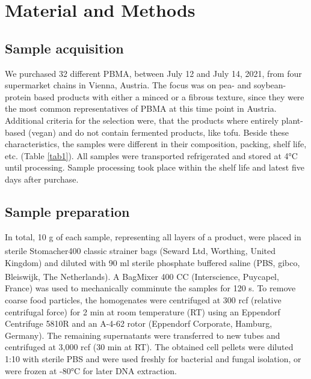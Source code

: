 \documentclass[preprint, 3p,
authoryear]{elsarticle} %
\begin{document}
\hypertarget{material-and-methods}{%
\section{Material and Methods}\label{material-and-methods}}

\hypertarget{sample-acquisition}{%
\subsection{Sample acquisition}\label{sample-acquisition}}

We purchased 32 different PBMA, between July 12 and July 14, 2021, from
four supermarket chains in Vienna, Austria. The focus was on pea- and
soybean- protein based products with either a minced or a fibrous
texture, since they were the most common representatives of PBMA at this
time point in Austria. Additional criteria for the selection were, that
the products where entirely plant-based (vegan) and do not contain
fermented products, like tofu. Beside these characteristics, the samples
were different in their composition, packing, shelf life, etc. (Table
\ref{tab1}). All samples were transported refrigerated and stored at 4°C
until processing. Sample processing took place within the shelf life and
latest five days after purchase.

\hypertarget{sample-preparation}{%
\subsection{Sample preparation}\label{sample-preparation}}

In total, 10 g of each sample, representing all layers of a product,
were placed in sterile Stomacher\textsuperscript{\textregistered}400
classic strainer bags (Seward Ltd, Worthing, United Kingdom) and diluted
with 90 ml sterile phosphate buffered saline (PBS, gibco, Bleiswijk, The
Netherlands). A BagMixer\textsuperscript{\textregistered} 400 CC
(Interscience, Puycapel, France) was used to mechanically comminute the
samples for 120 s. To remove coarse food particles, the homogenates were
centrifuged at 300 rcf (relative centrifugal force) for 2 min at room
temperature (RT) using an Eppendorf Centrifuge 5810R and an A-4-62 rotor
(Eppendorf Corporate, Hamburg, Germany). The remaining supernatants were
transferred to new tubes and centrifuged at 3,000 rcf (30 min at RT).
The obtained cell pellets were diluted 1:10 with sterile PBS and were
used freshly for bacterial and fungal isolation, or were frozen at -80°C
for later DNA extraction.
\end{document}
